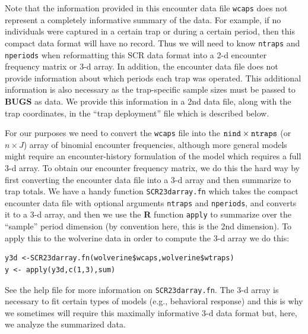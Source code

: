 Note that the information provided in this encounter data file
\mbox{\tt wcaps} does not represent a completely informative summary
of the data. For example, if no individuals were captured in a certain
trap or during a certain period, then this compact data format will
have no record. Thus we will need to know \mbox{\tt ntraps} and
\mbox{\tt nperiods} when reformatting this SCR data format into a 2-d
encounter frequency matrix or 3-d array. In addition, the encounter
data file does not provide information about which periods each trap
was operated. This additional information is also necessary as the
trap-specific sample sizes must be passed to {\bf BUGS} as data. We
provide this information in a 2nd data file, along with the trap
coordinates, in the ``trap deployment'' file which is described below.

For our purposes we need to convert the \mbox{\tt wcaps} file into the
$\mbox{\tt nind} \times \mbox{\tt ntraps}$ (or $n \times J$) array of
binomial encounter frequencies, although more general models might
require an encounter-history formulation of the model which requires a
full 3-d array.  To obtain our encounter frequency matrix, we do this
the hard way by first converting the encounter data file into a 3-d
array and then summarize to trap totals. We have a handy function
\mbox{\tt SCR23darray.fn} which takes the compact encounter data file
with optional arguments \mbox{\tt ntraps} and \mbox{\tt nperiods}, and
converts it to a 3-d array, and then we use the {\bf R} function
\mbox{\tt apply} to summarize over the ``sample'' period dimension (by
convention here, this is the 2nd dimension). To apply this to the
wolverine data in order to compute the 3-d array we do this: 
{\small
\begin{verbatim}
y3d <-SCR23darray.fn(wolverine$wcaps,wolverine$wtraps)
y <- apply(y3d,c(1,3),sum)
\end{verbatim}
} 
See the help file for more information on \mbox{\tt SCR23darray.fn}.
The 3-d array is necessary to fit certain types of models (e.g.,
behavioral response) and this is why we sometimes will require this
maximally informative 3-d data format but, here, we analyze the
summarized data.


